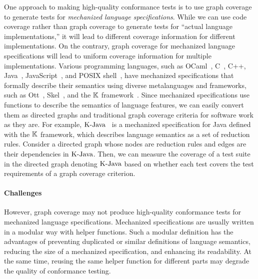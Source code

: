 
One approach to making high-quality conformance tests is to use graph coverage
to generate tests for \textit{mechanized language specifications}.
%
While we can use code coverage rather than graph coverage
to generate tests for ``actual language implementations,''
it will lead to different coverage information for different implementations.
On the contrary, graph coverage for mechanized language specifications
will lead to uniform coverage information for multiple implementations.
%
Various programming languages, such as OCaml~\cite{ocaml-light-spec},
C~\cite{c-light-spec}, C++\cite{cpp-spec}, Java~\cite{k-java},
JavaScript~\cite{jiset}, and POSIX shell~\cite{posix-shell-spec},
have mechanized specifications that formally describe their
semantics using diverse metalanguages and frameworks, such as Ott~\cite{ott}, Skel~\cite{skel}, and the
$\mathbb{K}$ framework~\cite{kframework}.
%
Since mechanized specifications use functions to describe the semantics of language features,
we can easily convert them as directed graphs and traditional graph coverage
criteria for software work as they are.
For example, $\text{K-Java}$~\cite{k-java} is a mechanized specification for Java
defined with the $\mathbb{K}$ framework, which describes language semantics
as a set of reduction rules.
Consider a directed graph whose nodes are reduction rules and edges are
their dependencies in $\text{K-Java}$.
Then, we can measure the coverage of a test suite in the directed graph denoting $\text{K-Java}$
based on whether each test covers the test requirements of a graph coverage criterion.


\paragraph{\textbf{Challenges}}
However, graph coverage may not produce high-quality conformance tests
for mechanized language specifications.
Mechanized specifications are usually written in a modular way with helper functions.
Such a modular definition has the advantages of preventing duplicated or similar
definitions of language semantics, reducing the size of a mechanized
specification, and enhancing its readability.
At the same time, reusing the same helper function for different parts
may degrade the quality of conformance testing.


